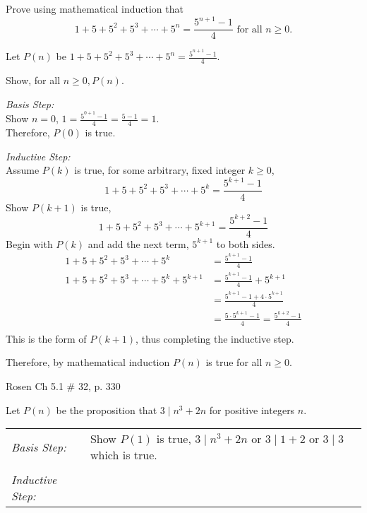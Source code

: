 \begin{questions}
 Prove using mathematical induction that
\[ 1 + 5 + 5^2 + 5^3 + \cdots + 5^n = \frac{5^{n+1} - 1}{4} \text{ for all } n\geq 0. \]
    \ifprintanswers
        \vspace{-10pt}
   \fi
\begin{solution}
    Let $P(n)$ be $1 + 5 + 5^2 + 5^3 + \cdots + 5^n = \frac{5^{n+1} - 1}{4}$.

    \smallskip
    Show, for all $n\geq 0, P(n)$.

    \smallskip
    \textit{Basis Step:}\\ Show $n=0$, $1 = \frac{5^{0+1} - 1}{4} = \frac{5-1}{4} = 1.$ \\
    Therefore, $P(0)$ is true.

    \smallskip
    \textit{Inductive Step:} \\
    Assume $P(k)$ is true, for some arbitrary, fixed integer $k \geq 0$,
       \[ 1 + 5 + 5^2 + 5^3 + \cdots + 5^k = \frac{5^{k+1} - 1}{4} \]
    Show $P(k+1)$ is true,
      \[ 1 + 5 + 5^2 + 5^3 + \cdots + 5^{k+1} = \frac{5^{k+2} - 1}{4} \]
    Begin with $P(k)$ and add the next term, $5^{k+1}$ to both sides.
    \begin{align*}
        1 + 5 + 5^2 + 5^3 + \cdots + 5^k &= \frac{5^{k+1} - 1}{4} \\
        1 + 5 + 5^2 + 5^3 + \cdots + 5^k  + 5^{k+1} &= \frac{5^{k+1} - 1}{4} + 5^{k+1} \\
          &= \frac{5^{k+1} - 1 + 4\cdot 5^{k+1}}{4} \\
          &= \frac{5\cdot 5^{k+1} - 1}{4} = \frac{5^{k+2} - 1}{4} \\
    \end{align*}
    This is the form of $P(k+1)$, thus completing the inductive step.

    Therefore, by mathematical induction $P(n)$ is true for all $n \geq 0$.
\end{solution}



 Rosen Ch 5.1 \# 32, p. 330
    \ifprintanswers
        \vspace{-10pt}
   \fi
\begin{solution}
Let $P(n)$ be the proposition that $3 \;|\; n^3 + 2n$ for positive integers $n$.

\smallskip
\begin{tabular}{ll}
  \textit{Basis Step:} & Show $P(1)$ is true, $3 \;|\; n^3 + 2n$ or $3 \;|\; 1 + 2$ or $3 \;|\; 3$ which is true. \\
   & \\
 \textit{Inductive Step:} &  \\
\end{tabular}


\end{solution}
\end{questions}
